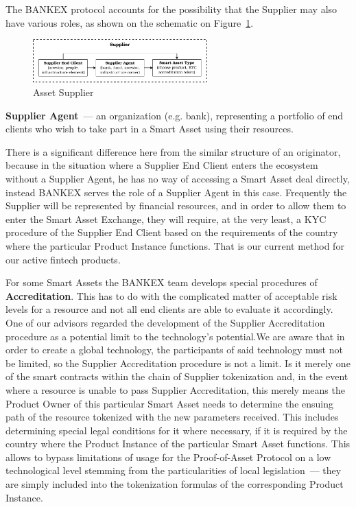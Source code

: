 \documentclass{article}
\begin{document}
\begin{multicols}{2}
The BANKEX protocol accounts for the possibility that the Supplier may also have various roles, as shown on the schematic on Figure~\ref{fig:supplier}.

\begin{figure}
  \centering
  \includegraphics[width=0.6\textwidth]{supplier.pdf}
  \caption{Asset Supplier}
  \label{fig:supplier}
\end{figure}

\textbf{Supplier Agent}~--- an organization (e.g. bank), representing a portfolio of end clients who wish to take part in a Smart Asset using their resources.

There is a significant difference here from the similar structure of an originator, because in the situation where a Supplier End Client enters the ecosystem without a Supplier Agent, he has no way of accessing a Smart Asset deal directly, instead BANKEX serves the role of a Supplier Agent in this case. Frequently the Supplier will be represented by financial resources, and in order to allow them to enter the Smart Asset Exchange, they will require, at the very least, a KYC procedure of the Supplier End Client based on the requirements of the country where the particular Product Instance functions. That is our current method for our active fintech products. 

For some Smart Assets the BANKEX team develops special procedures of \textbf{Accreditation}. This has to do with the complicated matter of acceptable risk levels for a resource and not all end clients are able to evaluate it accordingly. One of our advisors regarded the development of the Supplier Accreditation procedure as a potential limit to the technology's potential.We are aware that in order to create a global technology, the participants of said technology must not be limited, so the Supplier Accreditation procedure is not a limit. Is it merely one of the smart contracts within the chain of Supplier tokenization and, in the event where a resource is unable to pass Supplier Accreditation, this merely means the Product Owner of this particular Smart Asset needs to determine the ensuing path of the resource tokenized with the new parameters received. This includes determining special legal conditions for it where necessary, if it is required by the country where the Product Instance of the particular Smart Asset functions. This allows to bypass limitations of usage for the Proof-of-Asset Protocol on a low technological level stemming from the particularities of local legislation~--- they are simply included into the tokenization formulas of the corresponding Product Instance.


\end{multicols}
\end{document}
